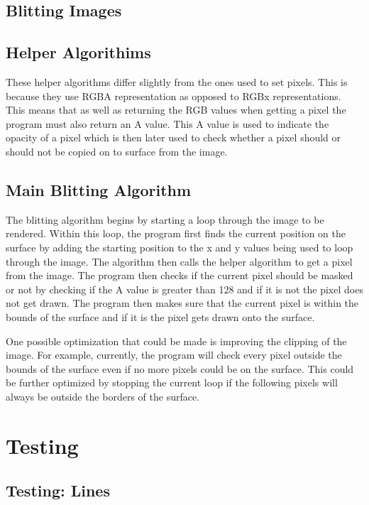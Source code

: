 \documentclass[
	a4paper, %
	10pt, %
]{CSUniSchoolLabReport}
\begin{document}
\subsection{Blitting Images}
\subsection*{Helper Algorithims}
\begin{flushleft}
	These helper algorithms differ slightly from the ones used to set pixels. This is because
	they use RGBA representation as opposed to RGBx representations. This means that as well as returning the RGB values
	when getting a pixel the program must also return an A value. This A value is used to indicate the opacity of a pixel 
	which is then later used to check whether a pixel should or should not be copied on to surface from the image.
\end{flushleft}
\subsection*{Main Blitting Algorithm}
\begin{flushleft}
	The blitting algorithm begins by starting a loop through the image to be rendered. Within this loop,
	the program first finds the current position on the surface by adding the starting position to the x and y
	values being used to loop through the image. The algorithm then calls the helper algorithm to get a pixel from the image.
	The program then checks if the current pixel should be masked or not by checking if the A value is greater than 128 and if it is not
	the pixel does not get drawn. The program
	then makes sure that the current pixel is within the bounds of the surface and if it is the pixel gets drawn onto the surface.
\end{flushleft}
\begin{flushleft}
	One possible optimization that could be made is improving the clipping of the image. For example, currently, the program will check every 
	pixel outside the bounds of the surface even if no more pixels could be on the surface. This could be further optimized
	by stopping the current loop if the following pixels will always be outside the borders of the surface.
\end{flushleft}
\section{Testing}
\subsection{Testing: Lines}
\end{document}

